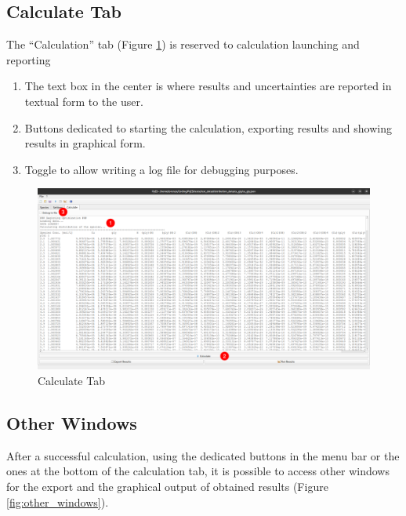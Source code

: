 \documentclass[a4paper, 12pt]{article}
\newcommand*\circled[1]{\kern-2.5em%
  \put(0,4){\color{red}\circle*{18}}\put(0,4){\circle{16}}%
  \put(-4,0){\color{white}\bfseries\large#1}~~}
\begin{document}
\subsection{Calculate Tab}
The ``Calculation'' tab (Figure \ref{fig:calculate}) is reserved to calculation launching and reporting

\begin{enumerate}[label=\protect\circled{\arabic*}]
    \item The text box in the center is where results and uncertainties are reported in textual form to the user.
    \item Buttons dedicated to starting the calculation, exporting results and showing results in graphical form.
    \item Toggle to allow writing a log file for debugging purposes.
\end{enumerate}

\begin{figure}[h]
	\centering
	\includegraphics[width=\textwidth]{img/calculate.png}
	\caption{Calculate Tab}
    \label{fig:calculate}
\end{figure}

\subsection{Other Windows}

After a successful calculation, using the dedicated buttons in the menu bar or the ones at the bottom of the calculation tab, it is possible to access other windows for the export and the graphical output of obtained results (Figure \ref*{fig:other_windows}).
\end{document}
